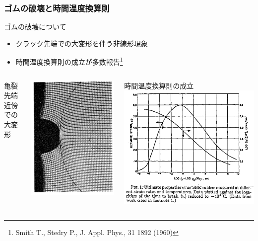 \documentclass[aspectratio=169,11pt, dvipdfmx]{beamer}
\begin{document}
\begin{frame}
	\frametitle{ゴムの破壊と時間温度換算則}
		\begin{alertblock}{ゴムの破壊について}
            \begin{itemize}
                \item クラック先端での大変形を伴う非線形現象
                \item 時間温度換算則の成立が多数報告\footnote{
                    Smith T., Stedry P., J. Appl. Phys., 31 1892 (1960)
                }
            \end{itemize}
		\end{alertblock}
		\vspace{-2mm}
		\begin{columns}[T, totalwidth=\textwidth]
            \centering
				亀裂先端近傍での大変形

				\vspace{-2mm}
				\begin{center}
					\includegraphics[width=.38\textwidth]{rubber_crack.png}
				\end{center}
				時間温度換算則の成立
				\includegraphics[width=.62\textwidth]{Time_Temp_2.png}
		\end{columns}
\end{frame}
\end{document}
